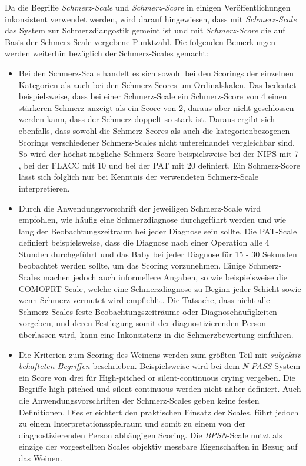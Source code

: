 \normalsize

Da die Begriffe \emph{Schmerz-Scale} und \emph{Schmerz-Score} in einigen Veröffentlichungen inkonsistent verwendet werden, wird  darauf hingewiesen, dass mit \emph{Schmerz-Scale} das System zur Schmerzdiangostik gemeint ist und mit \emph{Schmerz-Score} die auf Basis der Schmerz-Scale vergebene Punktzahl. Die folgenden Bemerkungen werden weiterhin bezüglich der Schmerz-Scales gemacht:

\begin{itemize}
	
	\item Bei den Schmerz-Scale handelt es sich sowohl bei den Scorings der einzelnen Kategorien als auch bei den Schmerz-Scores um Ordinalskalen. Das bedeutet beispielsweise, dass bei einer Schmerz-Scale ein Schmerz-Score von 4 einen stärkeren Schmerz anzeigt als ein Score von 2, daraus aber nicht geschlossen werden kann, dass der Schmerz doppelt so stark ist. Daraus ergibt sich ebenfalls, dass sowohl die Schmerz-Scores als auch die kategorienbezogenen Scorings verschiedener Schmerz-Scales nicht untereinandet vergleichbar sind. So wird der höchst mögliche Schmerz-Score beispielsweise bei der NIPS mit 7 \cite{nips}, bei der FLACC mit 10 \cite{flacc} und bei der PAT mit 20 \cite{pat} definiert. Ein Schmerz-Score lässt sich folglich nur bei Kenntnis der verwendeten Schmerz-Scale interpretieren.
	
	\item Durch die Anwendungsvorschrift der jeweiligen Schmerz-Scale wird empfohlen, wie häufig eine Schmerzdiagnose durchgeführt werden und wie lang der Beobachtungszeitraum bei jeder Diagnose sein sollte. Die PAT-Scale definiert beispielsweise, dass die Diagnose nach einer Operation alle 4 Stunden durchgeführt und das Baby bei jeder Diagnose für 15 - 30 Sekunden beobachtet werden sollte, um das Scoring vorzunehmen.\cite{pat} Einige Schmerz-Scales machen jedoch auch informellere Angaben, so wie beispielsweise die COMOFRT-Scale, welche eine Schmerzdiagnose \glqq zu Beginn jeder Schicht\grqq{} sowie \glqq wenn Schmerz vermutet wird\grqq{} empfiehlt.\cite[S. 241]{painAssessmentStatus}. Die Tatsache, dass nicht alle Schmerz-Scales feste Beobachtungszeiträume oder Diagnosehäufigkeiten vorgeben, und deren Festlegung somit der diagnostizierenden Person überlassen wird, kann eine Inkonsistenz in die Schmerzbewertung einführen.\cite[S. 100]{painInNeonates}
	
	\item Die Kriterien zum Scoring des Weinens werden zum größten Teil mit \emph{subjektiv behafteten Begriffen} beschrieben. Beispielsweise wird bei dem \emph{N-PASS}-System ein Score von drei für \glqq High-pitched or silent-continuous crying\grqq{} vergeben. Die Begriffe \glqq high-pitched\grqq{} und \glqq silent-continuous\grqq{} werden nicht näher definiert. Auch die Anwendungsvorschriften der Schmerz-Scales geben keine festen Definitionen. Dies erleichtert den praktischen Einsatz der Scales, führt jedoch zu einem Interpretationsspielraum und somit zu einem von der diagnostizierenden Person abhängigen Scoring. Die \emph{BPSN}-Scale nutzt als einzige der vorgestellten Scales objektiv messbare Eigenschaften in Bezug auf das Weinen.
	

\end{itemize}
